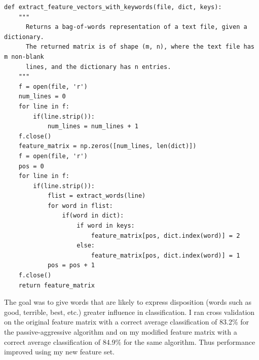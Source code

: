 \documentclass{article}
\begin{document}
\begin{enumerate}
\begin{lstlisting}   
def extract_feature_vectors_with_keywords(file, dict, keys):
    """
      Returns a bag-of-words representation of a text file, given a dictionary.
      The returned matrix is of shape (m, n), where the text file has m non-blank
      lines, and the dictionary has n entries.
    """
    f = open(file, 'r')
    num_lines = 0
    for line in f:
        if(line.strip()):
            num_lines = num_lines + 1
    f.close()
    feature_matrix = np.zeros([num_lines, len(dict)])
    f = open(file, 'r')
    pos = 0
    for line in f:
        if(line.strip()):
            flist = extract_words(line)
            for word in flist:
                if(word in dict):
                    if word in keys:
                        feature_matrix[pos, dict.index(word)] = 2
                    else:
                        feature_matrix[pos, dict.index(word)] = 1
            pos = pos + 1
    f.close()
    return feature_matrix
\end{lstlisting}

\bigskip

 The goal was to give words that are likely to express disposition (words such as good, terrible, best, etc.) greater influence in classification. I ran cross validation on the original feature matrix with a correct average classification of 83.2\% for the passive-aggressive algorithm and on my modified feature matrix with a correct average classification of 84.9\% for the same algorithm. Thus performance improved using my new feature set.
 
\end{enumerate}
\end{document}
